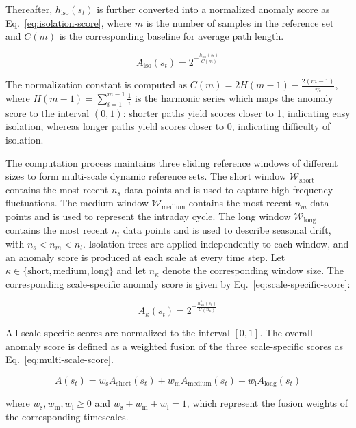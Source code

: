 ﻿\documentclass[preprint,12pt,number]{elsarticle}
\begin{document}
Thereafter, \(h_{\mathrm{iso}}(s_t)\) is further converted into a normalized anomaly score as Eq.~\eqref{eq:isolation-score}, where \(m\) is the number of samples in the reference set and \(C(m)\) is the corresponding baseline for average path length.

\[A_{\mathrm{iso}}(s_t) = 2^{-\frac{h_{\mathrm{iso}}(s_t)}{C(m)}} \tag{6}\label{eq:isolation-score}\]

The normalization constant is computed as \(C(m) = 2H(m-1) - \frac{2(m-1)}{m}\), where \(H(m-1)=\sum\limits_{i=1}^{m-1}\frac{1}{i}\) is the harmonic series which maps the anomaly score to the interval \((0,1)\): shorter paths yield scores closer to 1, indicating easy isolation, whereas longer paths yield scores closer to 0, indicating difficulty of isolation.

The computation process maintains three sliding reference windows of different sizes to form multi-scale dynamic reference sets. The short window \(\mathcal{W}_{\mathrm{short}}\) contains the most recent \(n_s\) data points and is used to capture high-frequency fluctuations. The medium window \(\mathcal{W}_{\mathrm{medium}}\) contains the most recent \(n_m\) data points and is used to represent the intraday cycle. The long window \(\mathcal{W}_{\mathrm{long}}\) contains the most recent \(n_l\) data points and is used to describe seasonal drift, with \(n_s < n_m < n_l\). Isolation trees are applied independently to each window, and an anomaly score is produced at each scale at every time step. Let \(\kappa\in\{\mathrm{short},\mathrm{medium},\mathrm{long}\}\) and let \(n_\kappa\) denote the corresponding window size. The corresponding scale-specific anomaly score is given by Eq.~\eqref{eq:scale-specific-score}:

\[A_{\kappa}(s_t)=2^{-\frac{h_{\mathrm{iso}}^{\kappa}(s_t)}{C(n_{\kappa})}} \tag{7}\label{eq:scale-specific-score}\]

All scale-specific scores are normalized to the interval \([0,1]\). The overall anomaly score is defined as a weighted fusion of the three scale-specific scores as Eq.~\eqref{eq:multi-scale-score}.

\[A(s_t)=w_{\mathrm{s}}A_{\mathrm{short}}(s_t)+w_{\mathrm{m}}A_{\mathrm{medium}}(s_t)+w_{\mathrm{l}}A_{\mathrm{long}}(s_t) \tag{8}\label{eq:multi-scale-score}\]

\noindent where \(w_{\mathrm{s}}, w_{\mathrm{m}}, w_{\mathrm{l}} \ge 0\) and \(w_{\mathrm{s}}+w_{\mathrm{m}}+w_{\mathrm{l}}=1\), which represent the fusion weights of the corresponding timescales.
\end{document}
